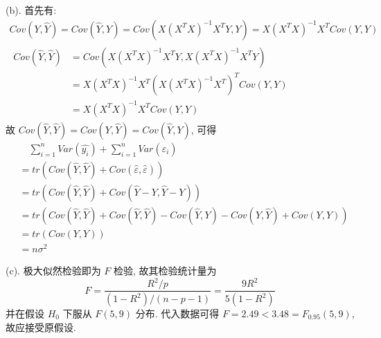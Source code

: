 \documentclass[\ROOT/main.tex]{subfiles}
\begin{document}
\noindent(b).
首先有:
\begin{gather*}
    Cov (Y, \widehat{Y})
    =
    Cov (\widehat{Y}, Y)
    =
    Cov (X (X^T X)^{-1} X^T Y, Y)
    =
    X (X^T X)^{-1} X^T Cov (Y, Y)
    \\
    \begin{split}
        Cov (\widehat{Y}, \widehat{Y})
        &=
        Cov (X (X^T X)^{-1} X^T Y, X (X^T X)^{-1} X^T Y)
        \\ &=
        X (X^T X)^{-1} X^T (X (X^T X)^{-1} X^T)^T Cov (Y, Y)
        \\ &=
        X (X^T X)^{-1} X^T Cov (Y, Y)
    \end{split}
\end{gather*}
故 $Cov (\widehat{Y}, \widehat{Y}) = Cov (Y, \widehat{Y}) = Cov (\widehat{Y}, Y)$, 可得
\begin{align*}
    & \quad
    \sum_{i = 1}^{n} Var ( \widehat{y_i} ) + \sum_{i = 1}^{n} Var ( \widehat{\varepsilon_i} )
    \\ &=
    tr ( Cov (\widehat{Y}, \widehat{Y}) + Cov (\widehat{\varepsilon}, \widehat{\varepsilon}) )
    \\ &=
    tr ( Cov (\widehat{Y}, \widehat{Y}) + Cov (\widehat{Y} - Y, \widehat{Y} - Y) )
    \\ &=
    tr ( Cov (\widehat{Y}, \widehat{Y}) + Cov (\widehat{Y}, \widehat{Y}) - Cov (\widehat{Y}, Y) - Cov (Y, \widehat{Y}) + Cov (Y, Y))
    \\ &=
    tr ( Cov (Y, Y) )
    \\ &=
    n \sigma^2
\end{align*}

\noindent(c).
极大似然检验即为 $F$ 检验, 故其检验统计量为
\[
    F
    =
    \frac{R^2 / p}{\left( 1 - R^2 \right) / \left( n - p - 1 \right)}
    =
    \frac{9 R^2}{5 \left( 1 - R^2 \right)}
\]
并在假设 $H_0$ 下服从 $F \left( 5, 9 \right)$ 分布.
代入数据可得 $F = 2.49 < 3.48 = F_{0.95} \left( 5, 9 \right)$, 故应接受原假设.
\end{document}
